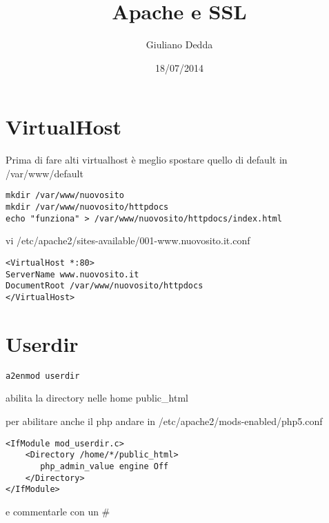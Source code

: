 \documentclass[]{article}
\title{Apache e SSL}
\author{Giuliano Dedda}
\date{18/07/2014}
\begin{document}
\maketitle

\section{VirtualHost}\label{virtualhost}

Prima di fare alti virtualhost è meglio spostare quello di default in
/var/www/default

\begin{verbatim}
mkdir /var/www/nuovosito
mkdir /var/www/nuovosito/httpdocs
echo "funziona" > /var/www/nuovosito/httpdocs/index.html
\end{verbatim}

vi /etc/apache2/sites-available/001-www.nuovosito.it.conf

\begin{verbatim}
<VirtualHost *:80>
ServerName www.nuovosito.it
DocumentRoot /var/www/nuovosito/httpdocs
</VirtualHost>
\end{verbatim}

\section{Userdir}\label{userdir}

\begin{verbatim}
a2enmod userdir
\end{verbatim}

abilita la directory nelle home public\_html

per abilitare anche il php andare in /etc/apache2/mods-enabled/php5.conf

\begin{verbatim}
<IfModule mod_userdir.c>
    <Directory /home/*/public_html>
       php_admin_value engine Off
    </Directory>
</IfModule>
\end{verbatim}

e commentarle con un \#
\end{document}
